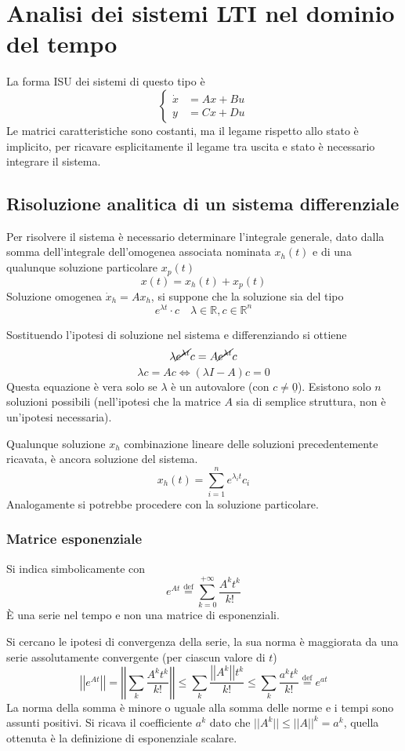 \chapter{Analisi dei sistemi LTI nel dominio del tempo}
La forma ISU dei sistemi di questo tipo è
$$\left\{\begin{aligned}
\dot x &= Ax +Bu \\
y &= Cx + Du
\end{aligned}\right.$$
Le matrici caratteristiche sono costanti, ma il legame rispetto allo stato è
implicito, per ricavare esplicitamente il legame tra uscita e stato è necessario
integrare il sistema.

\section{Risoluzione analitica di un sistema differenziale}
Per risolvere il sistema è necessario determinare l'integrale generale, dato
dalla somma dell'integrale dell'omogenea associata
nominata $x_h(t)$ e di una qualunque soluzione particolare $x_p(t)$
$$
x(t) =x_h(t) + x_p(t)
$$
Soluzione omogenea $\dot x_h = Ax_h$, si suppone che la soluzione sia del tipo
$$
e^{\lambda t}\cdot c\quad \lambda \in \mathbb{R}, c\in \mathbb{R}^n
$$

Sostituendo l'ipotesi di soluzione nel sistema e differenziando si ottiene
$$
\lambda \cancel{e^{\lambda t}} c = A\cancel{e^{\lambda t}} c
$$
$$
\lambda c = A c \Leftrightarrow (\lambda I -A)c = 0
$$
Questa equazione è vera solo se $\lambda$ è un autovalore (con $c\neq
\underline{0}$).
Esistono solo $n$ soluzioni possibili (nell'ipotesi che la matrice $A$ sia di
semplice struttura, non è un'ipotesi necessaria).

Qualunque soluzione $x_h$ combinazione lineare delle soluzioni precedentemente
ricavata, è ancora soluzione del sistema.
$$
x_h(t) = \sum_{i=1}^n e^{\lambda_i t} c_i
$$
Analogamente si potrebbe procedere con la soluzione particolare.

\subsection{Matrice esponenziale}
\label{sec.:metodo_diagonalizzazione}
Si indica simbolicamente con
\begin{equation}
e^{At} \stackrel{\text{def}}{=} \sum_{k=0}^{+\infty} \frac{A^k t^k}{k!}
\end{equation}
È una serie nel tempo e non una matrice di esponenziali.

Si cercano le ipotesi di convergenza della serie, la sua norma è maggiorata da
una serie assolutamente convergente (per ciascun valore di $t$)
$$
\left|\left|e^{At}\right|\right| = \left|\left|\sum_{k} \frac{A^k
t^k}{k!}\right|\right| \leq \sum_k \frac{\left|\left|A^k\right|\right| t^k}{k!}
\leq \sum_k \frac{a^kt^k}{k!} \stackrel{\text{def}}{=}e^{at}
$$
La norma della somma è minore o uguale alla somma delle norme e i tempi sono
assunti positivi.
Si ricava il coefficiente $a^k$ dato che $||A^k|| \leq ||A||^k = a^k $, quella
ottenuta è la definizione di esponenziale scalare.

